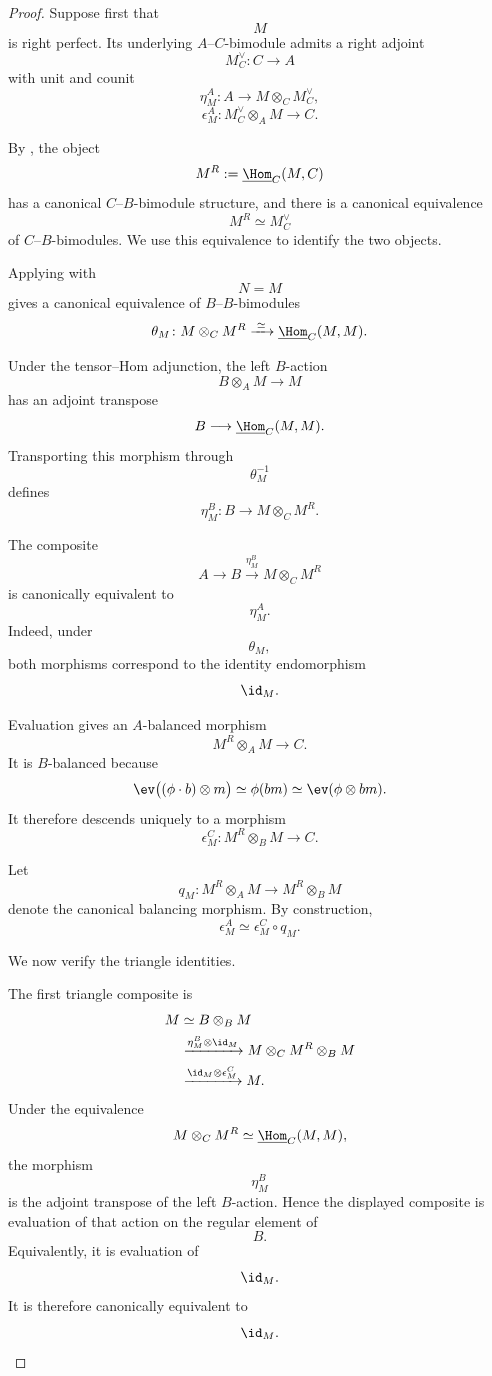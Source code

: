\begin{proof}
Suppose first that
\[
    M
\]
is right perfect. Its underlying $A$--$C$-bimodule admits a right
adjoint
\[
    M_C^\vee
    \colon
    C
    \longrightarrow
    A
\]
with unit and counit
\[
    \eta_M^{A}
    \colon
    A
    \longrightarrow
    M\otimes_C M_C^\vee,
\]
\[
    \epsilon_M^{A}
    \colon
    M_C^\vee\otimes_A M
    \longrightarrow
    C.
\]

By
,
the object
\[
    M^R
    :=
    \underline{\Hom}_C(M,C)
\]
has a canonical $C$--$B$-bimodule structure, and there is a canonical
equivalence
\[
    M^R
    \simeq
    M_C^\vee
\]
of $C$--$B$-bimodules. We use this equivalence to identify the two
objects.

Applying
with
\[
    N=M
\]
gives a canonical equivalence of $B$--$B$-bimodules
\[
    \theta_M
    \colon
    M\otimes_C M^R
    \xrightarrow{\;\simeq\;}
    \underline{\Hom}_C(M,M).
\]

Under the tensor--Hom adjunction, the left $B$-action
\[
    B\otimes_A M
    \longrightarrow
    M
\]
has an adjoint transpose
\[
    B
    \longrightarrow
    \underline{\Hom}_C(M,M).
\]
Transporting this morphism through
\[
    \theta_M^{-1}
\]
defines
\[
    \eta_M^{B}
    \colon
    B
    \longrightarrow
    M\otimes_C M^R.
\]

The composite
\[
    A
    \longrightarrow
    B
    \xrightarrow{\eta_M^{B}}
    M\otimes_C M^R
\]
is canonically equivalent to
\[
    \eta_M^{A}.
\]
Indeed, under
\[
    \theta_M,
\]
both morphisms correspond to the identity endomorphism
\[
    \id_M.
\]

Evaluation gives an $A$-balanced morphism
\[
    M^R\otimes_A M
    \longrightarrow
    C.
\]
It is $B$-balanced because
\[
    \ev\bigl((\phi\cdot b)\otimes m\bigr)
    \simeq
    \phi(bm)
    \simeq
    \ev(\phi\otimes bm).
\]
It therefore descends uniquely to a morphism
\[
    \epsilon_M^{C}
    \colon
    M^R\otimes_B M
    \longrightarrow
    C.
\]

Let
\[
    q_M
    \colon
    M^R\otimes_A M
    \longrightarrow
    M^R\otimes_B M
\]
denote the canonical balancing morphism. By construction,
\[
    \epsilon_M^{A}
    \simeq
    \epsilon_M^{C}\circ q_M.
\]

We now verify the triangle identities.

The first triangle composite is
\[
\begin{aligned}
    M
    &\simeq
    B\otimes_B M
    \\
    &\xrightarrow{
        \eta_M^{B}\otimes\id_M
    }
    M\otimes_C M^R\otimes_B M
    \\
    &\xrightarrow{
        \id_M\otimes\epsilon_M^{C}
    }
    M.
\end{aligned}
\]
Under the equivalence
\[
    M\otimes_C M^R
    \simeq
    \underline{\Hom}_C(M,M),
\]
the morphism
\[
    \eta_M^{B}
\]
is the adjoint transpose of the left $B$-action. Hence the displayed
composite is evaluation of that action on the regular element of
\[
    B.
\]
Equivalently, it is evaluation of
\[
    \id_M.
\]
It is therefore canonically equivalent to
\[
    \id_M.
\]


\end{proof}
